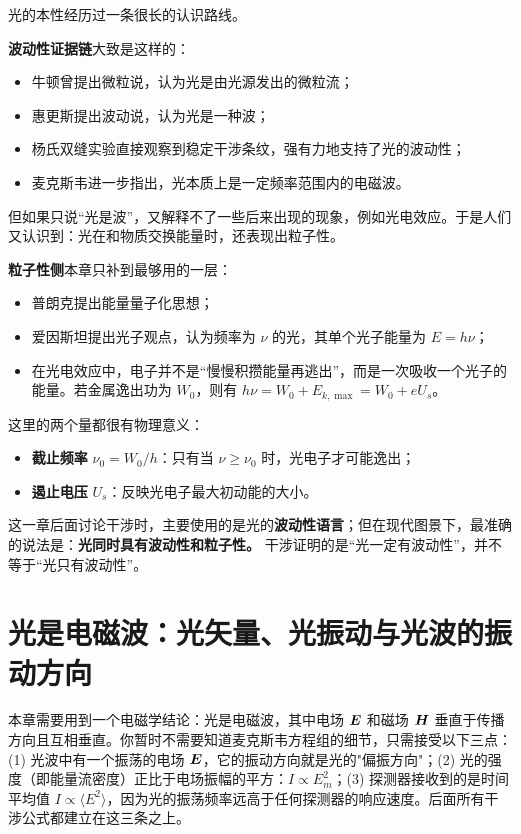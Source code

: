 \documentclass[lang=cn,11pt]{elegantbook}
\newcommand{\bridge}[1]{\begin{note}#1\end{note}}
\begin{document}
光的本性经历过一条很长的认识路线。

\textbf{波动性证据链}大致是这样的：
\begin{itemize}
  \item 牛顿曾提出微粒说，认为光是由光源发出的微粒流；
  \item 惠更斯提出波动说，认为光是一种波；
  \item 杨氏双缝实验直接观察到稳定干涉条纹，强有力地支持了光的波动性；
  \item 麦克斯韦进一步指出，光本质上是一定频率范围内的电磁波。
\end{itemize}

但如果只说“光是波”，又解释不了一些后来出现的现象，例如光电效应。于是人们又认识到：光在和物质交换能量时，还表现出粒子性。

\textbf{粒子性侧}本章只补到最够用的一层：
\begin{itemize}
  \item 普朗克提出能量量子化思想；
  \item 爱因斯坦提出光子观点，认为频率为 \(\nu\) 的光，其单个光子能量为 \(E=h\nu\)；
  \item 在光电效应中，电子并不是“慢慢积攒能量再逃出”，而是一次吸收一个光子的能量。若金属逸出功为 \(W_0\)，则有 \(h\nu=W_0+E_{k,\max}=W_0+eU_s\)。
\end{itemize}

这里的两个量都很有物理意义：
\begin{itemize}
  \item \textbf{截止频率} \(\nu_0=W_0/h\)：只有当 \(\nu\ge \nu_0\) 时，光电子才可能逸出；
  \item \textbf{遏止电压} \(U_s\)：反映光电子最大初动能的大小。
\end{itemize}

\begin{remark}
这一章后面讨论干涉时，主要使用的是光的\textbf{波动性语言}；但在现代图景下，最准确的说法是：\textbf{光同时具有波动性和粒子性。} 干涉证明的是“光一定有波动性”，并不等于“光只有波动性”。
\end{remark}

\section{光是电磁波：光矢量、光振动与光波的振动方向}

\bridge{本章需要用到一个电磁学结论：光是电磁波，其中电场 \(\vb*{E}\) 和磁场 \(\vb*{H}\) 垂直于传播方向且互相垂直。你暂时不需要知道麦克斯韦方程组的细节，只需接受以下三点：(1) 光波中有一个振荡的电场 \(\vb*{E}\)，它的振动方向就是光的"偏振方向"；(2) 光的强度（即能量流密度）正比于电场振幅的平方：\(I\propto E_m^2\)；(3) 探测器接收到的是时间平均值 \(I\propto\langle E^2\rangle\)，因为光的振荡频率远高于任何探测器的响应速度。后面所有干涉公式都建立在这三条之上。}
\end{document}
